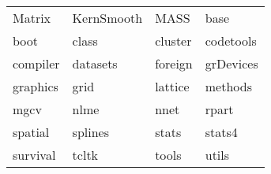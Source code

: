 \begin{tabular}{llll} 
Matrix & KernSmooth & MASS & base\\ 
boot & class & cluster & codetools\\ 
compiler & datasets & foreign & grDevices\\ 
graphics & grid & lattice & methods\\ 
mgcv & nlme & nnet & rpart\\ 
spatial & splines & stats & stats4\\ 
survival & tcltk & tools & utils \\ 
\end{tabular}
